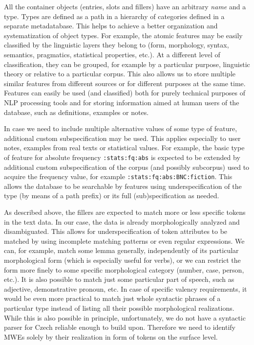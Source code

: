 \documentclass[output=paper,colorlinks,citecolor=brown]{langscibook}
\begin{document}
All the container objects (entries, slots and fillers) have an arbitrary \textit{name} and a type. Types are defined as a path in a hierarchy of categories defined in a separate metadatabase. This helps to achieve a better organization and systematization of object types. For example, the atomic features may be easily classified by the linguistic layers they belong to (form, morphology, syntax, semantics, pragmatics, statistical properties, etc.). At a different level of classification, they can be grouped, for example by a particular purpose, linguistic theory or relative to a particular corpus. This also allows us to store multiple similar features from different sources or for different purposes at the same time. Features can easily be used (and classified) both for purely technical purposes of NLP processing tools and for storing information aimed at human users of the database, such as definitions, examples or notes.

In case we need to include multiple alternative values of some type of feature, additional custom subspecification may be used. This applies especially to user notes, examples from real texts or statistical values. For example, the basic type of feature for absolute frequency \texttt{:stats:fq:abs} is expected to be extended by additional custom subspecification of the corpus (and possibly subcorpus) used to acquire the frequency value, for example \texttt{:stats:fq:abs:BNC:fiction}. This allows the database to be searchable by features using underspecification of the type (by means of a path prefix) or its full (sub)specification as needed.

As described above, the fillers are expected to match more or less specific tokens in the text data. In our case, the data is already morphologically analyzed and disambiguated. This allows for underspecification of token attributes to be matched by using incomplete matching patterns or even regular expressions. We can, for example, match some lemma generally, independently of its particular morphological form (which is especially useful for verbs), or we can restrict the form more finely to some specific morphological category (number, case, person, etc.).  It is also possible to match just some particular part of speech, such as adjective, demonstrative pronoun, etc. In case of specific valency requirements, it would be even more practical to match just whole syntactic phrases of a particular type instead of listing all their possible morphological realizations. While this is also possible in principle, unfortunately, we do not have a syntactic parser for Czech reliable enough to build upon. Therefore we need to identify MWEs solely by their realization in form of tokens on the surface level.
\end{document}
